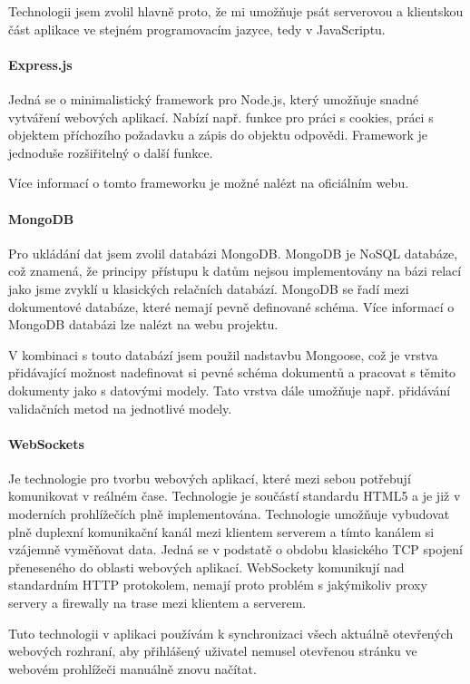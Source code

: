 \documentclass[ing,male,java,dept460]{diploma}						%
\begin{document}
Technologii jsem zvolil hlavně proto, že mi umožňuje psát serverovou a klientskou část aplikace ve stejném programovacím jazyce, tedy v JavaScriptu.

\paragraph{Express.js}
Jedná se o minimalistický framework pro Node.js, který umožňuje snadné vytváření webových aplikací. Nabízí např. funkce pro práci s cookies, práci s objektem příchozího požadavku a zápis do objektu odpovědi. Framework je jednoduše rozšiřitelný o další funkce.

Více informací o tomto frameworku je možné nalézt na oficiálním webu\cite{expressjs}.

\paragraph{MongoDB}
Pro ukládání dat jsem zvolil databázi MongoDB. MongoDB je NoSQL databáze, což znamená, že principy přístupu k datům nejsou implementovány na bázi relací jako jsme zvyklí u klasických relačních databází. MongoDB se řadí mezi dokumentové databáze, které nemají pevně definované schéma. Více informací o MongoDB databázi lze nalézt na webu projektu\cite{mongodb}.

V kombinaci s touto databází jsem použil nadstavbu Mongoose\cite{mongoose}, což je vrstva přidávající možnost nadefinovat si pevné schéma dokumentů a pracovat s těmito dokumenty jako s datovými modely. Tato vrstva dále umožňuje např. přidávání validačních metod na jednotlivé modely.

\paragraph{WebSockets}
Je technologie pro tvorbu webových aplikací, které mezi sebou potřebují komunikovat v reálném čase. Technologie je součástí standardu HTML5 a je již v moderních prohlížečích plně implementována. Technologie umožňuje vybudovat plně duplexní komunikační kanál mezi klientem serverem a tímto kanálem si vzájemně vyměňovat data. Jedná se v podstatě o obdobu klasického TCP spojení přeneseného do oblasti webových aplikací. WebSockety komunikují nad standardním HTTP protokolem, nemají proto problém s jakýmikoliv proxy servery a firewally na trase mezi klientem a serverem.

Tuto technologii v aplikaci používám k synchronizaci všech aktuálně otevřených webových rozhraní, aby přihlášený uživatel nemusel otevřenou stránku ve webovém prohlížeči manuálně znovu načítat.
\end{document}
